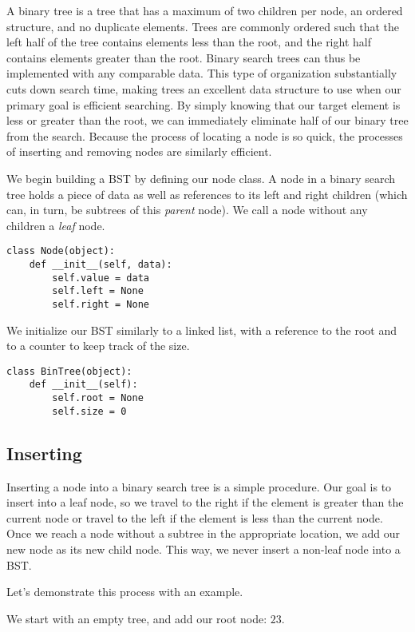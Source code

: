 A binary tree is a tree that has a maximum of two children per node, an ordered structure, and no duplicate elements. 
Trees are commonly ordered such that the left half of the tree contains elements less than the root, and the right half contains elements greater than the root. Binary search trees can thus be implemented with any comparable data.
This type of organization substantially cuts down search time, making trees an excellent data structure to use when our primary goal is efficient searching.
By simply knowing that our target element is less or greater than the root, we can immediately eliminate half of our binary tree from the search.
Because the process of locating a node is so quick, the processes of inserting and removing nodes are similarly efficient.

We begin building a BST by defining our node class. A node in a binary search tree holds a piece of data as well as references to its left and right children (which can, in turn, be subtrees of this \emph{parent} node).
We call a node without any children a \emph{leaf} node.

\begin{lstlisting}
class Node(object):
    def __init__(self, data):
        self.value = data
        self.left = None
        self.right = None
\end{lstlisting}
We initialize our BST similarly to a linked list, with a reference to the root and to a counter to keep track of the size.
\begin{lstlisting}
class BinTree(object):
    def __init__(self):
        self.root = None
        self.size = 0
\end{lstlisting}

\subsection*{Inserting}
Inserting a node into a binary search tree is a simple procedure.
Our goal is to insert into a leaf node, so we travel to the right if the element is greater than the current node or travel to the left if the element is less than the current node.
Once we reach a node without a subtree in the appropriate location, we add our new node as its new child node.
This way, we never insert a non-leaf node into a BST.

Let's demonstrate this process with an example.

\begin{minipage}{0.35\textwidth}
\end{minipage}\hfill
\begin{minipage}{0.55\textwidth}
    We start with an empty tree, and add our root node: $23$.
\end{minipage}

